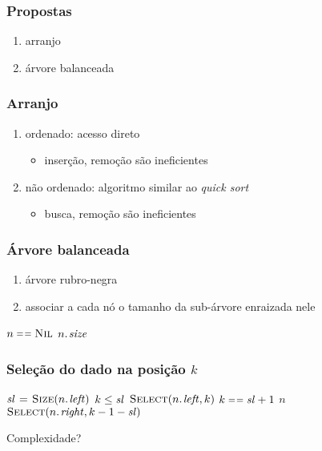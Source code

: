 \documentclass{beamer}
\begin{document}
\begin{frame}

\frametitle{Propostas}

\begin{enumerate}
\item arranjo
\item árvore balanceada
\end{enumerate}

\end{frame}

\begin{frame}

\frametitle{Arranjo}

\begin{enumerate}
\item ordenado: acesso direto
  \begin{itemize}
    \item inserção, remoção são ineficientes
  \end{itemize}
\item não ordenado: algoritmo similar ao \textit{quick sort\/}
  \begin{itemize}
    \item busca, remoção são ineficientes
  \end{itemize}
\end{enumerate}

\end{frame}

\begin{frame}

\frametitle{Árvore balanceada}

\begin{enumerate}
\item árvore rubro-negra
\item associar a cada nó o tamanho da sub-árvore enraizada nele
\end{enumerate}

\begin{codebox}
\li \If $n \isequal \const{Nil}$
\li \Then {}
\li \Else \Return $\attrib{n}{size}$
\End
\end{codebox}

\end{frame}

\begin{frame}
\frametitle{Seleção do dado na posição $k$}

\begin{codebox}
\li $\id{sl} \gets \proc{Size}(\attrib{n}{left})$
\li \If $k \le \id{sl}$
\li \Then \Return $\proc{Select}(\attrib{n}{left}, k)$
\li \ElseIf $k \isequal \id{sl}+1$
\li \Then \Return $n$
\li \ElseNoIf \Return $\proc{Select}(\attrib{n}{right}, k - 1 - \id{sl})$
  \End
\end{codebox}

\pause
\alert{Complexidade?}

\end{frame}
\end{document}
